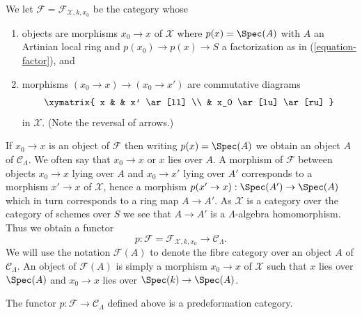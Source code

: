 \medskip\noindent
We let $\mathcal{F} = \mathcal{F}_{\mathcal{X}, k, x_0}$ be the
category whose
\begin{enumerate}
\item objects are morphisms $x_0 \to x$ of $\mathcal{X}$ where
$p(x) = \Spec(A)$ with $A$ an Artinian local ring and
$p(x_0) \to p(x) \to S$ a factorization as in (\ref{equation-factor}), and
\item morphisms $(x_0 \to x) \to (x_0 \to x')$ are commutative
diagrams
$$
\xymatrix{
x & & x' \ar[ll] \\
& x_0 \ar[lu] \ar[ru]
}
$$
in $\mathcal{X}$. (Note the reversal of arrows.)
\end{enumerate}
If $x_0 \to x$ is an object of $\mathcal{F}$ then writing $p(x) = \Spec(A)$
we obtain an object $A$ of $\mathcal{C}_\Lambda$. We often say that
$x_0 \to x$ or $x$ lies over $A$. A morphism of $\mathcal{F}$ between objects
$x_0 \to x$ lying over $A$ and $x_0 \to x'$ lying over $A'$
corresponds to a morphism $x' \to x$ of $\mathcal{X}$, hence a morphism
$p(x' \to x) : \Spec(A') \to \Spec(A)$ which in turn corresponds to a
ring map $A \to A'$. As $\mathcal{X}$ is a category
over the category of schemes over $S$ we see that $A \to A'$ is
a $\Lambda$-algebra homomorphism. Thus we obtain a functor
\begin{equation}
\label{equation-predeformation-category}
p : \mathcal{F} = \mathcal{F}_{\mathcal{X}, k, x_0}
\longrightarrow
\mathcal{C}_\Lambda.
\end{equation}
We will use the notation $\mathcal{F}(A)$ to denote the fibre category
over an object $A$ of $\mathcal{C}_\Lambda$. An object of $\mathcal{F}(A)$
is simply a morphism $x_0 \to x$ of $\mathcal{X}$ such that
$x$ lies over $\Spec(A)$ and $x_0 \to x$ lies over $\Spec(k) \to \Spec(A)$.

\begin{lemma}
\label{lemma-predeformation-category}
The functor $p : \mathcal{F} \to \mathcal{C}_\Lambda$ defined above
is a predeformation category.
\end{lemma}


